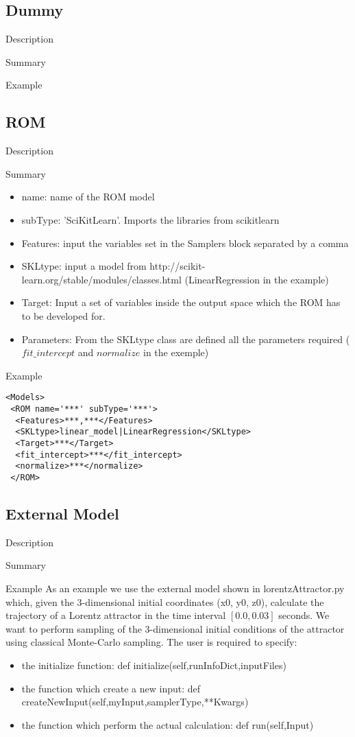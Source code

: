 \subsection{Dummy}
\label{sec:models_dummy}

Description

Summary

Example

\subsection{ROM}
\label{subsec:models_ROM}

Description

Summary 
\begin{itemize}
\item name: name of the ROM model
\item subType: 'SciKitLearn'. Imports the libraries from scikitlearn
\item Features: input the variables set in the Samplers block separated by a comma
\item SKLtype: input a model from http://scikit-learn.org/stable/modules/classes.html (LinearRegression in the example)
\item Target: Input a set of variables inside the output space which the ROM has to be developed for. 
\item Parameters: From the SKLtype class are defined all the parameters required ($fit\_intercept$ and $normalize$ in the exemple) 
\end{itemize}

Example

\begin{lstlisting}[style=XML]
<Models>
 <ROM name='***' subType='***'>
  <Features>***,***</Features>
  <SKLtype>linear_model|LinearRegression</SKLtype>
  <Target>***</Target>
  <fit_intercept>***</fit_intercept>
  <normalize>***</normalize>
 </ROM>
\end{lstlisting}




\subsection{External Model}
\label{subsec:models_externalModel}

Description

Summary

Example
As an example we use the external model shown in lorentzAttractor.py which, given the 3-dimensional initial coordinates (x0, y0, z0), calculate the trajectory of a Lorentz attractor in the time interval $[0.0,0.03]$ seconds.
We want to perform sampling of the 3-dimensional initial conditions of the attractor using classical Monte-Carlo sampling.
The user is required to specify:
\begin{itemize}
\item the initialize function: def initialize(self,runInfoDict,inputFiles)
\item the function which create a new input: def createNewInput(self,myInput,samplerType,**Kwargs)
\item the function which perform the actual calculation: def run(self,Input)
\end{itemize}

